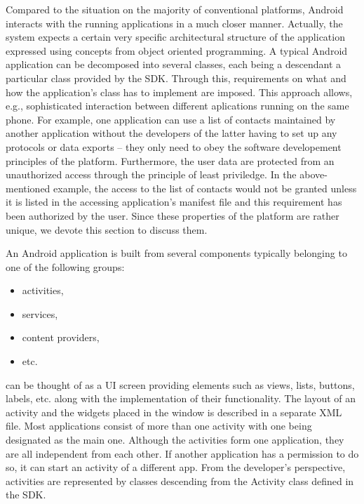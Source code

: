 Compared to the situation on the majority of conventional platforms, Android interacts with the running applications in a much closer manner. 
Actually, the system expects a certain very specific architectural structure of the application expressed using concepts from object oriented programming. 
A typical Android application can be decomposed into several classes, each being a descendant a particular class provided by the SDK. 
Through this, requirements on what and how the application's class has to implement are imposed. 
This approach allows, e.g., sophisticated interaction between different aplications running on the same phone. 
For example, one application can use a list of contacts maintained by another application without the developers of the latter having to set up any protocols or data exports -- they only need to obey the software developement principles of the platform. %
Furthermore, the user data are protected from an unauthorized access through the principle of least priviledge. 
In the above-mentioned example, the access to the list of contacts would not be granted unless it is listed in the accessing application's manifest file and this requirement has been authorized by the user. 
Since these properties of the platform are rather unique, we devote this section to discuss them. 

An Android application is built from several components typically belonging to one of the following groups: 
\begin{itemize}
\item{activities,}
\item{services,}
\item{content providers,}
\item{etc.}
\end{itemize}

 can be thought of as a UI screen providing elements such as views, lists, buttons, labels, etc. along with the implementation of their functionality.
The layout of an activity and the widgets placed in the window is described in a separate XML file. 
Most applications consist of more than one activity with one being designated as the main one.
Although the activities form one application, they are all independent from each other.
If another application has a permission to do so, it can start an activity of a different app.
From the developer's perspective, activities are represented by classes descending from the Activity class defined in the SDK. 

